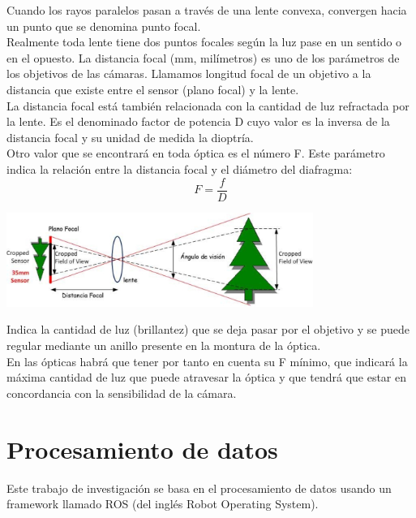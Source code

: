 Cuando los rayos paralelos pasan a través de una lente convexa, convergen 
hacia un punto que se denomina punto focal.\\
Realmente toda lente tiene dos puntos focales según la luz pase en un sentido o
en el opuesto. La distancia focal (mm, milímetros) es uno de los parámetros de los 
objetivos de las cámaras. Llamamos longitud  focal de un objetivo a la distancia que 
existe entre el sensor (plano focal) y la lente.\\
La distancia focal está también relacionada con la cantidad de luz
refractada por la lente. Es el denominado factor de potencia D cuyo valor es la inversa
de la distancia focal y su unidad de medida la dioptría.\\
Otro valor que se encontrará en toda óptica es el número F. Este parámetro
indica la relación entre la distancia focal y el diámetro del diafragma:
\begin{equation}
    F = \frac{f}{D}    
\end{equation}
\begin{center}
    \includegraphics[width=0.75\textwidth]{Capitulo2/Fig1_4.eps}       
    \label{Fig1_4}
\end{center}
Indica la cantidad de luz (brillantez) que se deja pasar por el objetivo y se puede regular 
mediante un anillo presente en la montura de la óptica.\\
En las ópticas habrá que tener por
tanto en cuenta su F mínimo, que indicará la máxima cantidad de luz que puede
atravesar la óptica y que tendrá que estar en concordancia con la sensibilidad de la
cámara.



\section{Procesamiento de datos}
Este trabajo de investigación se basa en el procesamiento de datos usando un framework
llamado ROS (del inglés Robot Operating System).
